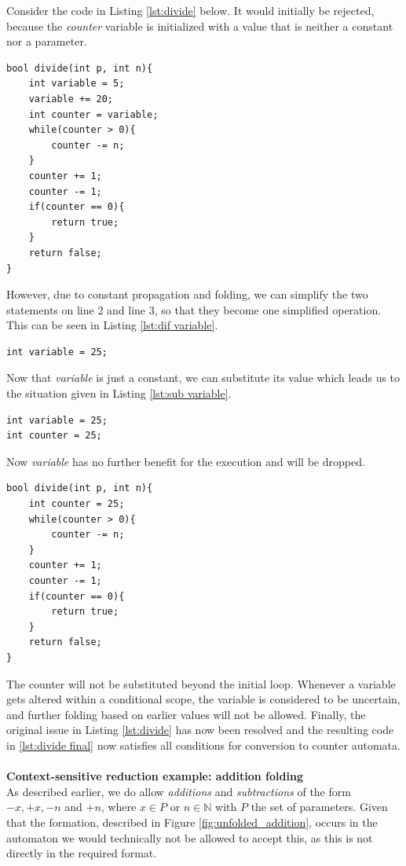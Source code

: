 \documentclass[12pt]{thesis}
\begin{document}
Consider the code in Listing \ref{lst:divide} below. It would initially be rejected, because the \textit{counter} variable is initialized with a value that is neither a constant nor a parameter.

\begin{lstlisting}[style=CStyle, caption={Example of a function in need of constant propagation}, label={lst:divide}]
bool divide(int p, int n){
	int variable = 5;
	variable += 20;
	int counter = variable;
	while(counter > 0){
		counter -= n;
	}
	counter += 1;
	counter -= 1;
	if(counter == 0){
		return true;
	}
	return false;
}
\end{lstlisting}

However, due to constant propagation and folding, we can simplify the two statements on line 2 and line 3, so that they become one simplified operation. This can be seen in Listing \ref{lst:dif variable}.

\begin{lstlisting}[style=CStyle, caption={Result of simplifying operations on \textit{variable}}, label={lst:dif variable}]
int variable = 25;
\end{lstlisting}

Now that \textit{variable} is just a constant, we can substitute its value which leads us to the situation given in Listing \ref{lst:sub variable}.
\begin{lstlisting}[style=CStyle, caption={Result of substituting \textit{variable}}, label={lst:sub variable}]
int variable = 25;
int counter = 25;
\end{lstlisting}

Now \textit{variable} has no further benefit for the execution and will be dropped. 

\begin{lstlisting}[style=CStyle, caption={Final version of the simplified function}, label={lst:divide final}]
bool divide(int p, int n){
	int counter = 25;
	while(counter > 0){
		counter -= n;
	}
	counter += 1;
	counter -= 1;
	if(counter == 0){
		return true;
	}
	return false;
}
\end{lstlisting}

The counter will not be substituted beyond the initial loop. Whenever a variable gets altered within a conditional scope, the variable is considered to be uncertain, and further folding based on earlier values will not be allowed. Finally, the original issue in Listing \ref{lst:divide} has now been resolved and the resulting code in \ref{lst:divide final} now satisfies all conditions for conversion to counter automata.\\
\\
\noindent
\textbf{Context-sensitive reduction example: addition folding}\\
As described earlier, we do allow \textit{additions} and \textit{subtractions} of the form $-x, +x, -n$ and $+n$, where $x \in P$ or $n \in \mathbb{N}$ with $P$ the set of parameters. Given that the formation, described in Figure \ref{fig:unfolded_addition}, occurs in the automaton we would technically not be allowed to accept this, as this is not directly in the required format.
\end{document}
